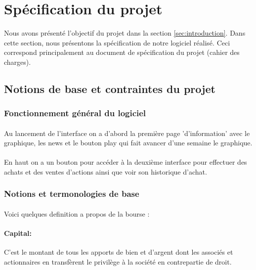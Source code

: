 \newpage
\section{Spécification du projet}
\label{sec:specification}

\paragraph{} Nous avons présenté l'objectif du projet dans la section \ref{sec:introduction}. Dans cette section, nous présentons la spécification de notre logiciel réalisé. Ceci correspond principalement au document de spécification du projet (cahier des charges).

\subsection{Notions de base et contraintes du projet}
\label{sec:spec1}

\subsubsection{Fonctionnement général du logiciel}
\paragraph{} Au lancement de l'interface on a d'abord la première page 'd'information' avec le graphique, les news et le bouton play qui fait avancer d'une semaine le graphique. 
\paragraph{}En haut on a un bouton pour accéder à la deuxième interface pour effectuer des achats et des ventes d'actions ainsi que voir son historique d'achat.

\subsubsection{Notions et termonologies de base}

\paragraph{} Voici quelques definition a propos de la bourse :
\paragraph{Capital:}C'est le montant de tous les apports de bien et d'argent dont les associés et actionnaires en transfèrent le privilège à la société en contrepartie de droit.

